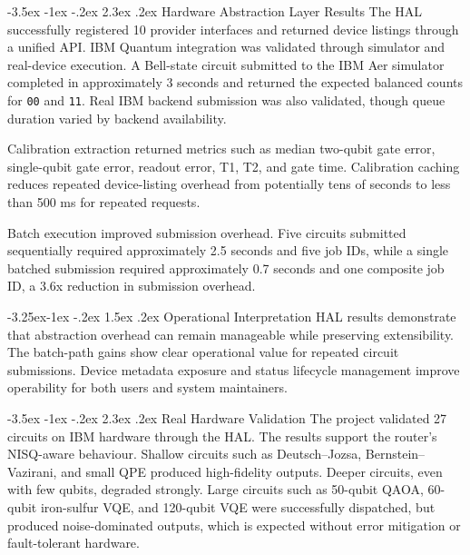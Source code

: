 \documentclass[12pt,a4paper]{report}
\makeatletter
\renewcommand\section{\@startsection{section}{1}{\z@}%
  {-3.5ex \@plus -1ex \@minus -.2ex}%
  {2.3ex \@plus.2ex}%
  {\normalfont\bfseries\fontsize{12pt}{16pt}\selectfont}}
\renewcommand\subsection{\@startsection{subsection}{2}{\z@}%
  {-3.25ex\@plus -1ex \@minus -.2ex}%
  {1.5ex \@plus .2ex}%
  {\normalfont\bfseries\fontsize{12pt}{16pt}\selectfont}}
\makeatother
\begin{document}
\section{Hardware Abstraction Layer Results}
The HAL successfully registered 10 provider interfaces and returned device listings through a unified API. IBM Quantum integration was validated through simulator and real-device execution. A Bell-state circuit submitted to the IBM Aer simulator completed in approximately 3 seconds and returned the expected balanced counts for \texttt{00} and \texttt{11}. Real IBM backend submission was also validated, though queue duration varied by backend availability.

Calibration extraction returned metrics such as median two-qubit gate error, single-qubit gate error, readout error, T1, T2, and gate time. Calibration caching reduces repeated device-listing overhead from potentially tens of seconds to less than 500 ms for repeated requests.

Batch execution improved submission overhead. Five circuits submitted sequentially required approximately 2.5 seconds and five job IDs, while a single batched submission required approximately 0.7 seconds and one composite job ID, a 3.6x reduction in submission overhead.

\subsection{Operational Interpretation}
HAL results demonstrate that abstraction overhead can remain manageable while preserving extensibility. The batch-path gains show clear operational value for repeated circuit submissions. Device metadata exposure and status lifecycle management improve operability for both users and system maintainers.

\section{Real Hardware Validation}
The project validated 27 circuits on IBM hardware through the HAL. The results support the router's NISQ-aware behaviour. Shallow circuits such as Deutsch--Jozsa, Bernstein--Vazirani, and small QPE produced high-fidelity outputs. Deeper circuits, even with few qubits, degraded strongly. Large circuits such as 50-qubit QAOA, 60-qubit iron-sulfur VQE, and 120-qubit VQE were successfully dispatched, but produced noise-dominated outputs, which is expected without error mitigation or fault-tolerant hardware.
\end{document}
